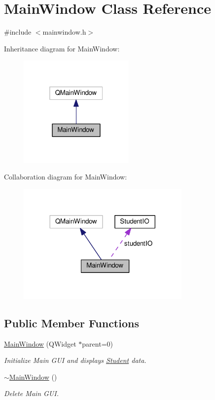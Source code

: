 \hypertarget{class_main_window}{}\section{Main\+Window Class Reference}
\label{class_main_window}


{\ttfamily \#include $<$mainwindow.\+h$>$}



Inheritance diagram for Main\+Window\+:
\nopagebreak
\begin{figure}[H]
\begin{center}
\leavevmode
\includegraphics[width=160pt]{class_main_window__inherit__graph}
\end{center}
\end{figure}


Collaboration diagram for Main\+Window\+:
\nopagebreak
\begin{figure}[H]
\begin{center}
\leavevmode
\includegraphics[width=240pt]{class_main_window__coll__graph}
\end{center}
\end{figure}
\subsection*{Public Member Functions}
\begin{DoxyCompactItemize}
\item 
\hyperlink{class_main_window_a8b244be8b7b7db1b08de2a2acb9409db}{Main\+Window} (Q\+Widget $\ast$parent=0)
\begin{DoxyCompactList}\small\item\em Initialize Main G\+UI and displays \hyperlink{class_student}{Student} data. \end{DoxyCompactList}\item 
\hyperlink{class_main_window_ae98d00a93bc118200eeef9f9bba1dba7}{$\sim$\+Main\+Window} ()
\begin{DoxyCompactList}\small\item\em Delete Main G\+UI. \end{DoxyCompactList}\end{DoxyCompactItemize}
